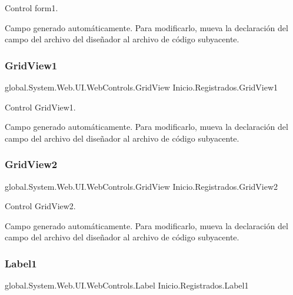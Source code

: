 Control form1. 

Campo generado automáticamente. Para modificarlo, mueva la declaración del campo del archivo del diseñador al archivo de código subyacente. \mbox{\label{class_inicio_1_1_registrados_aad3adbb47738fefadfe5efa1dfb19b92}} 
\subsubsection{\texorpdfstring{GridView1}{GridView1}}
{\footnotesize\ttfamily global.\+System.\+Web.\+U\+I.\+Web\+Controls.\+Grid\+View Inicio.\+Registrados.\+Grid\+View1\hspace{0.3cm}{\ttfamily [protected]}}



Control Grid\+View1. 

Campo generado automáticamente. Para modificarlo, mueva la declaración del campo del archivo del diseñador al archivo de código subyacente. \mbox{\label{class_inicio_1_1_registrados_acf5a95ef87b37efcf6ad23cb0df13110}} 
\subsubsection{\texorpdfstring{GridView2}{GridView2}}
{\footnotesize\ttfamily global.\+System.\+Web.\+U\+I.\+Web\+Controls.\+Grid\+View Inicio.\+Registrados.\+Grid\+View2\hspace{0.3cm}{\ttfamily [protected]}}



Control Grid\+View2. 

Campo generado automáticamente. Para modificarlo, mueva la declaración del campo del archivo del diseñador al archivo de código subyacente. \mbox{\label{class_inicio_1_1_registrados_a89cbfd8509272c14e26ee466a11b7835}} 
\subsubsection{\texorpdfstring{Label1}{Label1}}
{\footnotesize\ttfamily global.\+System.\+Web.\+U\+I.\+Web\+Controls.\+Label Inicio.\+Registrados.\+Label1\hspace{0.3cm}{\ttfamily [protected]}}



